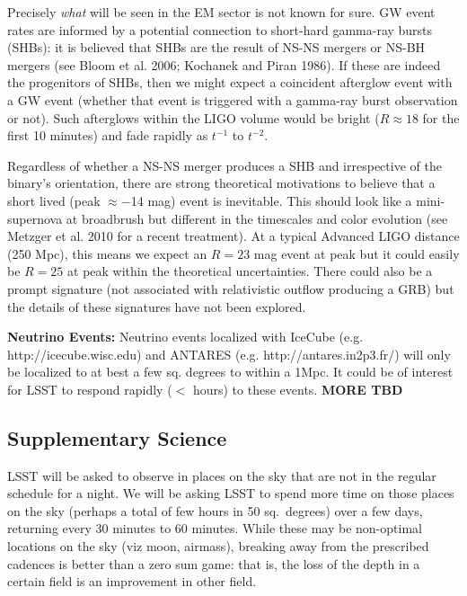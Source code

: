 \documentclass [11pt]{article}
\begin{document}

Precisely {\it what} will be seen in the EM sector is not known for sure. GW event rates are informed by a potential connection to short-hard gamma-ray bursts (SHBs): it is believed that SHBs are the result of NS-NS mergers or NS-BH mergers (see Bloom et al. 2006; Kochanek and Piran 1986). If these are indeed the progenitors of SHBs, then we might expect a coincident afterglow event with a GW event (whether that event is triggered with a gamma-ray burst observation or not). Such afterglows within the LIGO volume would be bright ($R\approx 18$ for the first 10 minutes) and fade rapidly as $t^{-1}$ to $t^{-2}$.

Regardless of whether a NS-NS merger produces a SHB and irrespective of the binary's orientation, there are strong theoretical motivations to believe that a short lived (peak $\approx -$14 mag) event is inevitable. This should look like a mini-supernova at broadbrush but different in the timescales and color evolution (see Metzger et al. 2010 for a recent treatment). At a typical Advanced LIGO distance (250 Mpc), this means we expect an $R=23$ mag event at peak but it could easily be $R=25$ at peak within the theoretical uncertainties. There could also be a prompt signature (not associated with relativistic outflow producing a GRB) but the details of these signatures have not been explored.
 
\medskip

{\bf Neutrino Events:} Neutrino events localized with IceCube (e.g. http://icecube.wisc.edu) and ANTARES  (e.g.  http://antares.in2p3.fr/) will only be localized to at best a few sq. degrees to within a 1Mpc. It could be of interest for LSST to respond rapidly ($<$ hours) to these events.  {\bf MORE TBD}

\subsection{Supplementary Science}


LSST will be asked to observe in places on the sky that are not in the regular schedule for a night. We will be asking LSST to spend more time on those places on the sky (perhaps a total of few hours in 50 sq.~degrees) over a few days, returning every 30 minutes to 60 minutes. While these may be non-optimal locations on the sky (viz moon, airmass), breaking away from the prescribed cadences is better than a zero sum game: that is, the loss of the depth in a certain field is an improvement in other field. 
\end{document}
